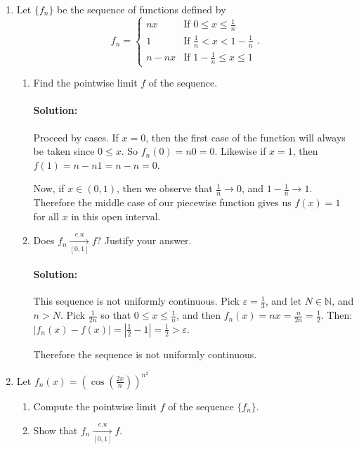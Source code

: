 \documentclass{article}
\begin{document}
\begin{enumerate} 

\item Let $\{f_n\}$ be the sequence of functions defined by
  \[
  f_n=\begin{cases}
    nx &\text{If } 0\leq x\leq \frac{1}{n}\\
    1 &\text{If } \frac{1}{n}<x<1-\frac{1}{n}\\
    n-nx &\text{If } 1-\frac{1}{n}\leq x \leq 1
  \end{cases}
  .\] 

  \begin{enumerate}
    \item Find the pointwise limit $f$ of the sequence.
      \paragraph{Solution: }Proceed by cases. If $x=0$, then the first case of the function will always be
      taken since $0\leq x$. So $f_n(0)=n0=0$. Likewise if $x=1$, then $f(1)=n-n 1=n-n=0$.

      Now, if $x\in (0,1)$, then we observe that $\frac{1}{n}\to 0$, and $1-\frac{1}{n}\to 1$. Therefore the middle case of our piecewise function gives us $f(x)=1$ for all $x$ in this open interval. 

    \item Does $f_n\xrightarrow[{[0,1]}]{c.u}f$? Justify your answer.
      \paragraph{Solution: }This sequence is not uniformly continuous. Pick $\varepsilon=\frac{1}{3}$, and let $N\in \mathbb{N}$, and $n>N$. Pick $\frac{1}{2n}$ so that $0\leq x\leq \frac{1}{n}$, and then $f_n(x)=nx=\frac{n}{2n}=\frac{1}{2}$. Then: $\left| f_n(x)-f(x) \right| = \left| \frac{1}{2}-1 \right|=\frac{1}{2}>\varepsilon$.

        Therefore the sequence is not uniformly continuous.

  \end{enumerate}

\item Let $f_n(x)=\left( \cos\left( \frac{2x}{n}\right)  \right)^{n^2}$

  \begin{enumerate}
    \item Compute the pointwise limit $f$ of the sequence $\{f_n\} $.
    \item Show that $f_n\xrightarrow[{[0,1]}]{c.u}f$.
  \end{enumerate}


\end{enumerate}
\end{document}
